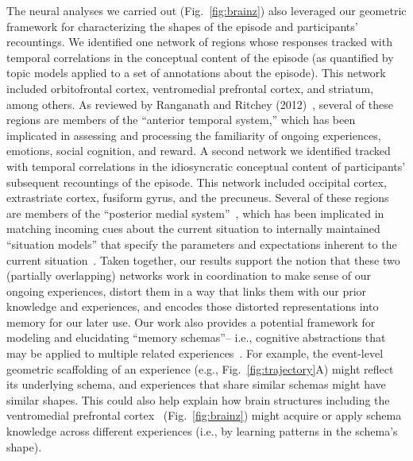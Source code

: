 \documentclass[10pt]{article}
\begin{document}
The neural analyses we carried out (Fig.~\ref{fig:brainz}) also leveraged our geometric framework for characterizing the shapes of the episode and participants' recountings.  We identified one network of regions whose responses tracked with temporal correlations in the conceptual content of the episode (as quantified by topic models applied to a set of annotations about the episode).  This network included orbitofrontal cortex, ventromedial prefrontal cortex, and striatum, among others.  As reviewed by Ranganath and Ritchey (2012)~\cite{RangRitc12}, several of these regions are members of the ``anterior temporal system,'' which has been implicated in assessing and processing the familiarity of ongoing experiences, emotions, social cognition, and reward.  A second network we identified tracked with temporal correlations in the idiosyncratic conceptual content of participants' subsequent recountings of the episode.  This network included occipital cortex, extrastriate cortex, fusiform gyrus, and the precuneus.  Several of these regions are members of the ``posterior medial system''~\citep{RangRitc12}, which has been implicated in matching incoming cues about the current situation to internally maintained ``situation models'' that specify the parameters and expectations inherent to the current situation~\citep{ZackEtal07, ZwaaRadv98}.  Taken together, our results support the notion that these two (partially overlapping) networks work in coordination to make sense of our ongoing experiences, distort them in a way that links them with our prior knowledge and experiences, and encodes those distorted representations into memory for our later use.  Our work also provides a potential framework for modeling and elucidating ``memory schemas''-- i.e., cognitive abstractions that may be applied to multiple related experiences~\citep{GilbMarl17, BaldEtal18}.  For example, the event-level geometric scaffolding of an experience (e.g., Fig.~\ref{fig:trajectory}A) might reflect its underlying schema, and experiences that share similar schemas might have similar shapes.  This could also help explain how brain structures including the ventromedial prefrontal cortex~\citep{GilbMarl17} (Fig.~\ref{fig:brainz}) might acquire or apply schema knowledge across different experiences (i.e., by learning patterns in the schema's shape).
\end{document}
